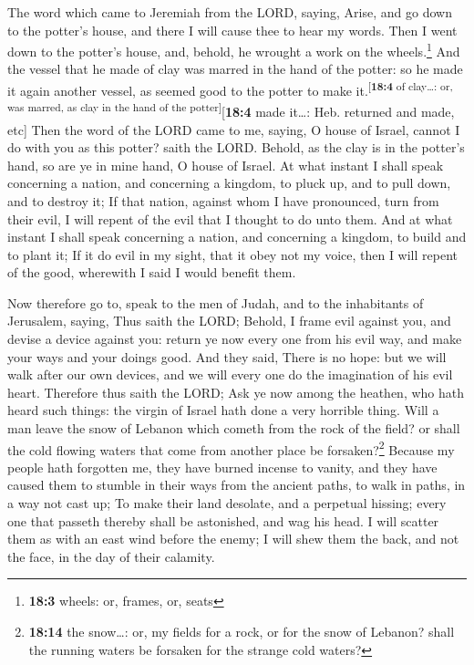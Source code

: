  The word which came to Jeremiah from the LORD, saying,
 Arise, and go down to the potter's house, and there I
will cause thee to hear my words.  Then I went down to the
potter's house, and, behold, he wrought a work on the wheels.\footnote{\textbf{18:3}
  wheels: or, frames, or, seats}  And the vessel that he
made of clay was marred in the hand of the potter: so he made it again
another vessel, as seemed good to the potter to make
it.\textsuperscript{{[}\textbf{18:4} of clay\ldots: or, was marred, as
clay in the hand of the potter{]}}{[}\textbf{18:4} made it\ldots: Heb.
returned and made, etc{]}  Then the word of the LORD came
to me, saying,  O house of Israel, cannot I do with you as
this potter? saith the LORD. Behold, as the clay is in the potter's
hand, so are ye in mine hand, O house of Israel.  At what
instant I shall speak concerning a nation, and concerning a kingdom, to
pluck up, and to pull down, and to destroy it;  If that
nation, against whom I have pronounced, turn from their evil, I will
repent of the evil that I thought to do unto them.  And at
what instant I shall speak concerning a nation, and concerning a
kingdom, to build and to plant it;  If it do evil in my
sight, that it obey not my voice, then I will repent of the good,
wherewith I said I would benefit them.

 Now therefore go to, speak to the men of Judah, and to
the inhabitants of Jerusalem, saying, Thus saith the LORD; Behold, I
frame evil against you, and devise a device against you: return ye now
every one from his evil way, and make your ways and your doings good.
 And they said, There is no hope: but we will walk after
our own devices, and we will every one do the imagination of his evil
heart.  Therefore thus saith the LORD; Ask ye now among
the heathen, who hath heard such things: the virgin of Israel hath done
a very horrible thing.  Will a man leave the snow of
Lebanon which cometh from the rock of the field? or shall the cold
flowing waters that come from another place be forsaken?\footnote{\textbf{18:14}
  the snow\ldots: or, my fields for a rock, or for the snow of Lebanon?
  shall the running waters be forsaken for the strange cold waters?}
 Because my people hath forgotten me, they have burned
incense to vanity, and they have caused them to stumble in their ways
from the ancient paths, to walk in paths, in a way not cast up;
 To make their land desolate, and a perpetual hissing;
every one that passeth thereby shall be astonished, and wag his head.
 I will scatter them as with an east wind before the
enemy; I will shew them the back, and not the face, in the day of their
calamity.


